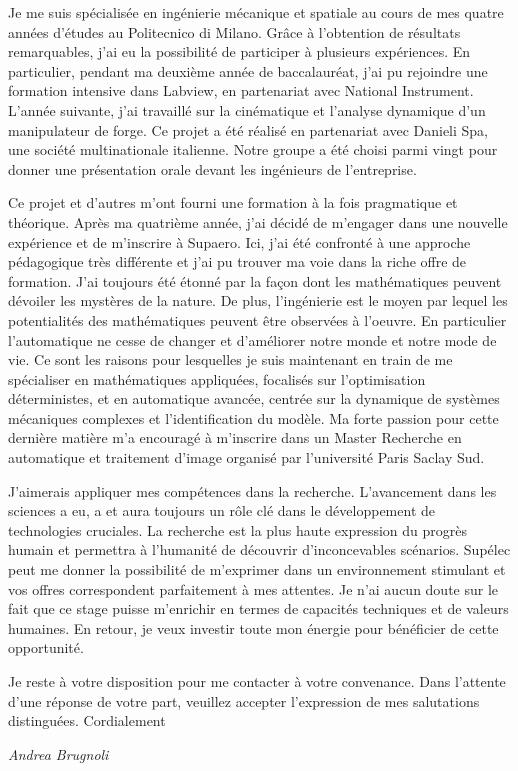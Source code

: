 \documentclass[11pt]{letter}
\begin{document}
Je me suis spécialisée en ingénierie mécanique et spatiale au cours de mes quatre années d'études au Politecnico di Milano. Grâce à l'obtention de résultats remarquables, j'ai eu la possibilité de participer à plusieurs expériences. En particulier, pendant ma deuxième année de baccalauréat, j'ai pu rejoindre une formation intensive dans Labview, en partenariat avec National Instrument. L'année suivante, j'ai travaillé sur la cinématique et l'analyse dynamique d'un manipulateur de forge. Ce projet a été réalisé en partenariat avec Danieli Spa, une société multinationale italienne. Notre groupe a été choisi parmi vingt pour donner une présentation orale devant les ingénieurs de l'entreprise.
\begin{comment}
J'ai spécialement apprécié de travailler sur un projet de transfert interplanétaire. Dans des missions spatiales complexes différentes disciplines doivent être intégrées et c'est la raison pour la quelle j'ai travaillé passionnément au projet. Plus tard, j'ai eu l'occasion de travailler sur la dynamique multi-corps dans l'environnement Simulink pour étudier les flexibilités des appendices au cours de manoeuvres de satellites.
\end{comment}
 Ce projet et d'autres m'ont fourni une formation à la fois pragmatique et théorique. Après ma quatrième année, j'ai décidé de m'engager dans une nouvelle expérience et de m'inscrire à Supaero. Ici, j'ai été confronté à une approche pédagogique très différente et j'ai pu trouver ma voie dans la riche offre de formation. J'ai toujours été étonné par la façon dont les mathématiques peuvent dévoiler les mystères de la nature. De plus, l'ingénierie est le moyen par lequel les potentialités des mathématiques peuvent être observées à l'oeuvre. En particulier l'automatique ne cesse de changer et d'améliorer notre monde et notre mode de vie. Ce sont les raisons pour lesquelles je suis maintenant en train de me spécialiser en mathématiques appliquées, focalisés sur l'optimisation déterministes,  et en automatique avancée, centrée sur la dynamique de systèmes mécaniques complexes et l'identification du modèle. Ma forte passion pour cette dernière matière m'a encouragé à m'inscrire dans un Master Recherche en automatique et traitement d'image organisé par l'université Paris Saclay Sud. 

J'aimerais appliquer mes compétences dans la recherche. L'avancement dans les sciences a eu, a et aura toujours un rôle clé dans le développement de technologies cruciales. La recherche est la plus haute expression du progrès humain et permettra à l'humanité de découvrir d'inconcevables scénarios.  Supélec peut me donner la possibilité de m'exprimer dans un environnement stimulant et vos offres correspondent parfaitement à mes attentes. Je n'ai aucun doute sur le fait que ce stage puisse m'enrichir en termes de capacités techniques et de valeurs humaines. En retour, je veux investir toute mon énergie pour bénéficier de cette opportunité.

Je reste à votre disposition pour me contacter à votre convenance. Dans l'attente d'une réponse de votre part, veuillez accepter l'expression de mes salutations distinguées. Cordialement


 \begin{center}
 \large\textit{Andrea Brugnoli}
 \end{center}
 
\end{document}
